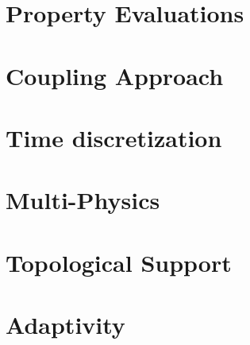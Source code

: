 \documentclass[12pt]{report}
\begin{document}
\section{Property Evaluations}


\section{Coupling Approach}


\section{Time discretization}


\section{Multi-Physics}


\section{Topological Support}


\section{Adaptivity}




\end{document}
